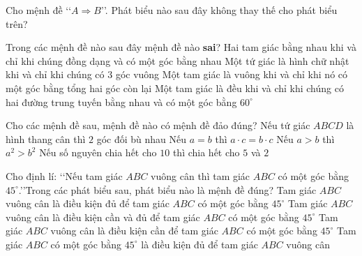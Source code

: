 

\begin{ex}%
	Cho mệnh đề \lq\lq$A\Rightarrow B$\rq\rq. Phát biểu nào sau đây không thay thế cho  phát biểu trên?
\end{ex}

\begin{ex}%
	Trong các mệnh đề nào sau đây  mệnh đề nào {\bf sai}?
	\choice 
		{\True Hai tam giác bằng nhau khi và chỉ khi chúng đồng dạng và có  một góc bằng nhau}
		{Một tứ giác là hình chữ nhật khi và chỉ khi chúng  có $3$ góc vuông}
		{Một tam giác là vuông khi và chỉ khi nó có một góc bằng tổng hai góc còn  lại}
		{Một tam giác là đều khi và chỉ khi chúng có hai đường trung tuyến bằng nhau và có một góc  bằng $60^{\circ}$}
\end{ex}

\begin{ex}%
	Cho các mệnh đề sau, mệnh  đề nào có mệnh đề đảo đúng?
	 \choice
		{Nếu tứ  giác $ABCD$ là hình thang cân thì $2$ góc đối bù nhau}
		 {Nếu $a=b$ thì $a\cdot c=b\cdot c$}
		 {Nếu $a>b$ thì $a^{2}>b^{2}$}
		{\True Nếu số nguyên chia hết cho $10$ thì  chia hết cho $5$ và $2$}
\end{ex}

\begin{ex}%
	Cho định lí: \lq\lq Nếu tam giác $ABC$ vuông cân thì tam giác $ABC$ có một góc bằng $45^{\circ}$.\rq\rq Trong các phát biểu sau, phát  biểu nào là mệnh đề đúng?
	 \choice
		{\True Tam giác $ABC$ vuông cân là điều kiện đủ  để tam giác $ABC$ có một góc bằng $45^{\circ}$}
		{Tam giác $ABC$ vuông cân là  điều kiện cần và đủ để tam giác $ABC$ có một góc bằng $45^{\circ}$}
		{Tam giác $ABC$ vuông cân là điều kiện cần để tam giác $ABC$  có một góc bằng $45^{\circ}$}
		{Tam giác $ABC$ có một góc bằng $45^{\circ}$ là điều  kiện đủ để tam giác $ABC$ vuông cân}
\end{ex}

